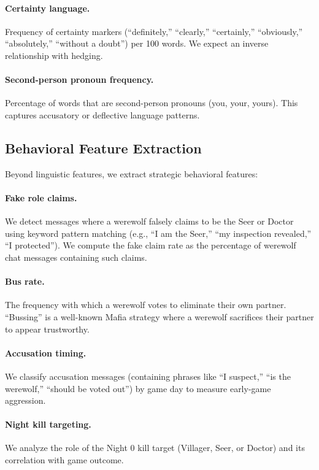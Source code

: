 \paragraph{Certainty language.} Frequency of certainty markers (``definitely,'' ``clearly,'' ``certainly,'' ``obviously,'' ``absolutely,'' ``without a doubt'') per 100 words. We expect an inverse relationship with hedging.

\paragraph{Second-person pronoun frequency.} Percentage of words that are second-person pronouns (you, your, yours). This captures accusatory or deflective language patterns.

\subsection{Behavioral Feature Extraction}

Beyond linguistic features, we extract strategic behavioral features:

\paragraph{Fake role claims.} We detect messages where a werewolf falsely claims to be the Seer or Doctor using keyword pattern matching (e.g., ``I am the Seer,'' ``my inspection revealed,'' ``I protected''). We compute the fake claim rate as the percentage of werewolf chat messages containing such claims.

\paragraph{Bus rate.} The frequency with which a werewolf votes to eliminate their own partner. ``Bussing'' is a well-known Mafia strategy where a werewolf sacrifices their partner to appear trustworthy.

\paragraph{Accusation timing.} We classify accusation messages (containing phrases like ``I suspect,'' ``is the werewolf,'' ``should be voted out'') by game day to measure early-game aggression.

\paragraph{Night kill targeting.} We analyze the role of the Night 0 kill target (Villager, Seer, or Doctor) and its correlation with game outcome.

